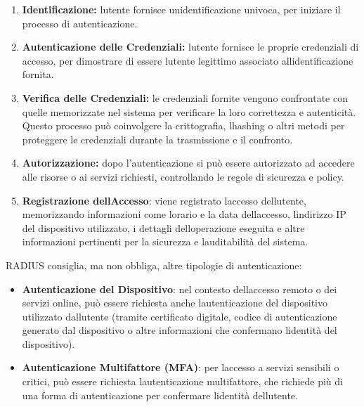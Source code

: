 \begin{enumerate}
\def\labelenumi{\arabic{enumi}.}
\item
  \textbf{Identificazione:} l\textquotesingle utente fornisce
  un\textquotesingle identificazione univoca, per iniziare il processo
  di autenticazione.
\item
  \textbf{Autenticazione delle Credenziali:} l\textquotesingle utente
  fornisce le proprie credenziali di accesso, per dimostrare di essere
  l\textquotesingle utente legittimo associato
  all\textquotesingle identificazione fornita.
\item
  \textbf{Verifica delle Credenziali:} le credenziali fornite vengono
  confrontate con quelle memorizzate nel sistema per verificare la loro
  correttezza e autenticità. Questo processo può coinvolgere la
  crittografia, l\textquotesingle hashing o altri metodi per proteggere
  le credenziali durante la trasmissione e il confronto.
\item
  \textbf{Autorizzazione:} dopo l'autenticazione si può essere
  autorizzato ad accedere alle risorse o ai servizi richiesti,
  controllando le regole di sicurezza e policy.
\item
  \textbf{Registrazione dell\textquotesingle Accesso}: viene registrato
  l\textquotesingle accesso dell\textquotesingle utente, memorizzando
  informazioni come l\textquotesingle orario e la data
  dell\textquotesingle accesso, l\textquotesingle indirizzo IP del
  dispositivo utilizzato, i dettagli dell\textquotesingle operazione
  eseguita e altre informazioni pertinenti per la sicurezza e
  l\textquotesingle auditabilità del sistema.
\end{enumerate}

RADIUS consiglia, ma non obbliga, altre tipologie di autenticazione:

\begin{itemize}
\item
  \textbf{Autenticazione del Dispositivo}: nel contesto
  dell\textquotesingle accesso remoto o dei servizi online, può essere
  richiesta anche l\textquotesingle autenticazione del dispositivo
  utilizzato dall\textquotesingle utente (tramite certificato digitale,
  codice di autenticazione generato dal dispositivo o altre informazioni
  che confermano l\textquotesingle identità del dispositivo).
\item
  \textbf{Autenticazione Multifattore (MFA)}: per
  l\textquotesingle accesso a servizi sensibili o critici, può essere
  richiesta l\textquotesingle autenticazione multifattore, che richiede
  più di una forma di autenticazione per confermare
  l\textquotesingle identità dell\textquotesingle utente.
\end{itemize}

